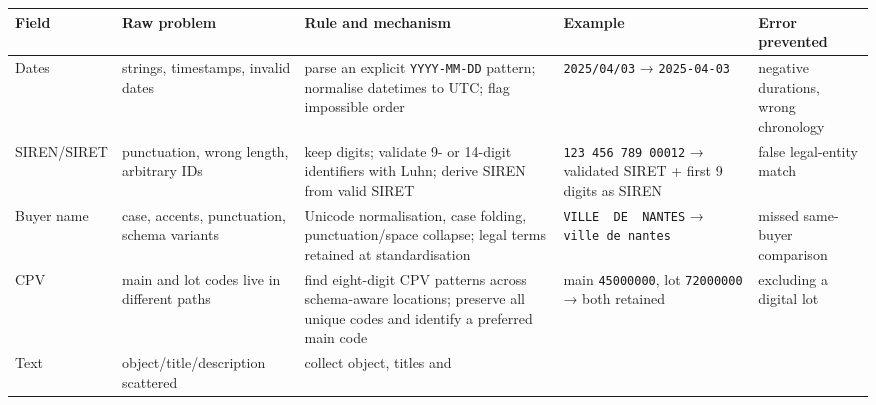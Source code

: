 {\def\LTcaptype{none} %
\begin{longtable}[]{@{}
  >{\raggedright\arraybackslash}p{}
  >{\raggedright\arraybackslash}p{}
  >{\raggedright\arraybackslash}p{}
  >{\raggedright\arraybackslash}p{}
  >{\raggedright\arraybackslash}p{}@{}}
\toprule\noalign{}
\begin{minipage}[b]{\linewidth}\raggedright
Field
\end{minipage} & \begin{minipage}[b]{\linewidth}\raggedright
Raw problem
\end{minipage} & \begin{minipage}[b]{\linewidth}\raggedright
Rule and mechanism
\end{minipage} & \begin{minipage}[b]{\linewidth}\raggedright
Example
\end{minipage} & \begin{minipage}[b]{\linewidth}\raggedright
Error prevented
\end{minipage} \\
\midrule\noalign{}
\endhead
\bottomrule\noalign{}
\endlastfoot
Dates & strings, timestamps, invalid dates & parse an explicit
\texttt{YYYY-MM-DD} pattern; normalise datetimes to UTC; flag impossible
order & \texttt{2025/04/03} → \texttt{2025-04-03} & negative durations,
wrong chronology \\
SIREN/SIRET & punctuation, wrong length, arbitrary IDs & keep digits;
validate 9- or 14-digit identifiers with Luhn; derive SIREN from valid
SIRET & \texttt{123\ 456\ 789\ 00012} → validated SIRET + first 9 digits
as SIREN & false legal-entity match \\
Buyer name & case, accents, punctuation, schema variants & Unicode
normalisation, case folding, punctuation/space collapse; legal terms
retained at standardisation & \texttt{VILLE\ \ DE\ \ NANTES} →
\texttt{ville\ de\ nantes} & missed same-buyer comparison \\
CPV & main and lot codes live in different paths & find eight-digit CPV
patterns across schema-aware locations; preserve all unique codes and
identify a preferred main code & main \texttt{45000000}, lot
\texttt{72000000} → both retained & excluding a digital lot \\
Text & object/title/description scattered & collect object, titles and

\end{longtable}}
